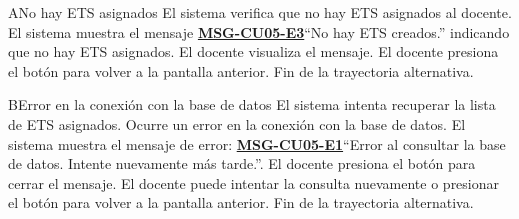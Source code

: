 \begin{UCtrayectoriaA}{A}{No hay ETS asignados}
	\UCpaso El sistema verifica que no hay ETS asignados al docente.
	\UCpaso El sistema muestra el mensaje \textbf{\hyperref[msg:CU05-E3]{MSG-CU05-E3}}{``No hay ETS creados.''} indicando que no hay ETS asignados.
	\UCpaso[\UCactor] El docente visualiza el mensaje.
	\UCpaso[\UCactor] El docente presiona el botón  para volver a la pantalla anterior.
	\UCpaso Fin de la trayectoria alternativa.
\end{UCtrayectoriaA}

\begin{UCtrayectoriaA}{B}{Error en la conexión con la base de datos}
	\UCpaso El sistema intenta recuperar la lista de ETS asignados.
	\UCpaso Ocurre un error en la conexión con la base de datos.
	\UCpaso El sistema muestra el mensaje de error: \textbf{\hyperref[msg:CU05-E1]{MSG-CU05-E1}}{``Error al consultar la base de datos. Intente nuevamente más tarde.''}.
	\UCpaso[\UCactor] El docente presiona el botón  para cerrar el mensaje.
	\UCpaso[\UCactor] El docente puede intentar la consulta nuevamente o presionar el botón  para volver a la pantalla anterior.
	\UCpaso Fin de la trayectoria alternativa.
\end{UCtrayectoriaA}

